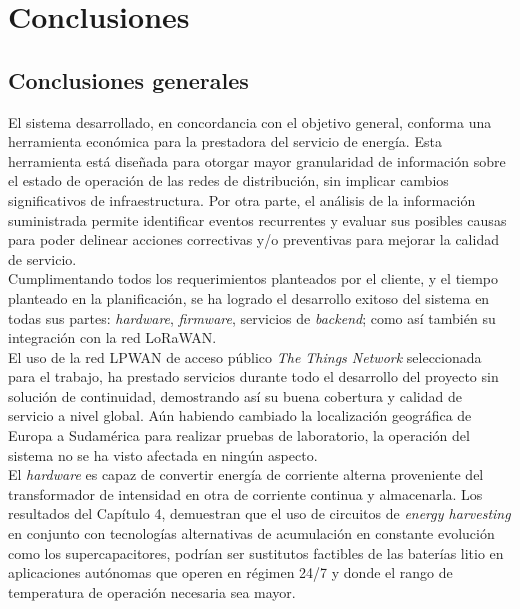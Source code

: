 
\chapter{Conclusiones} %

\label{Chapter5} %




\section{Conclusiones generales }
El sistema desarrollado, en concordancia con el objetivo general, conforma una herramienta económica para la prestadora del servicio de energía. Esta herramienta está diseñada para otorgar mayor granularidad de información sobre el estado de operación de las redes de distribución, sin implicar cambios significativos de infraestructura. Por otra parte, el análisis de la información suministrada permite identificar eventos recurrentes y evaluar sus posibles causas para poder delinear acciones correctivas y/o preventivas para mejorar la calidad de servicio.\\
Cumplimentando todos los requerimientos planteados por el cliente, y el tiempo planteado en la planificación, se ha logrado el desarrollo exitoso del sistema en todas sus partes: \textit{hardware}, \textit{firmware}, servicios de \textit{backend}; como así también su integración con la red LoRaWAN.\\
El uso de la red LPWAN de acceso público \textit{The Things Network} seleccionada para el trabajo, ha prestado servicios durante todo el desarrollo del proyecto sin solución de continuidad, demostrando así su buena cobertura y calidad de servicio a nivel global. A\'{u}n habiendo cambiado la localización geográfica de Europa a Sudamérica para realizar pruebas de laboratorio, la operación del sistema no se ha visto afectada en ningún aspecto.\\
El \textit{hardware} es capaz de convertir energía de corriente alterna proveniente del transformador de intensidad en otra de corriente continua y almacenarla. Los resultados del Capítulo 4, demuestran que el uso de circuitos de \textit{energy harvesting} en conjunto con tecnologías alternativas de acumulación en constante evolución como los supercapacitores, podrían ser sustitutos factibles de las baterías litio en aplicaciones autónomas que operen en régimen 24/7 y donde el rango de temperatura de operación necesaria sea mayor.\\
